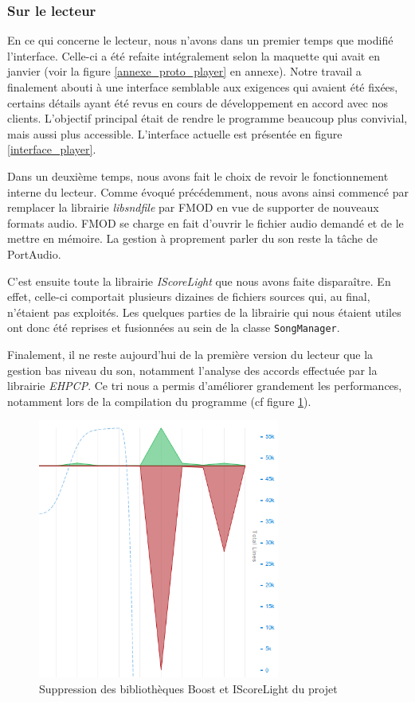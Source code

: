 \documentclass[a4paper,11pt]{article}
\begin{document}
\subsubsection{Sur le lecteur}

En ce qui concerne le lecteur, nous n'avons dans un premier temps que modifié l'interface. Celle-ci a été refaite intégralement selon la maquette qui avait en janvier (voir la figure \ref{annexe_proto_player} en annexe). Notre travail a finalement abouti à une interface semblable aux exigences qui avaient été fixées, certains détails ayant été revus en cours de développement en accord avec nos clients. L'objectif principal était de rendre le programme beaucoup plus convivial, mais aussi plus accessible. L'interface actuelle est présentée en figure \ref{interface_player}.

Dans un deuxième temps, nous avons fait le choix de revoir le fonctionnement interne du lecteur. Comme évoqué précédemment, nous avons ainsi commencé par remplacer la librairie \textit{libsndfile} par FMOD en vue de supporter de nouveaux formats audio. FMOD se charge en fait d'ouvrir le fichier audio demandé et de le mettre en mémoire. La gestion à proprement parler du son reste la tâche de PortAudio.

C'est ensuite toute la librairie \textit{IScoreLight} que nous avons faite disparaître. En effet, celle-ci comportait plusieurs dizaines de fichiers sources qui, au final, n'étaient pas exploités. Les quelques parties de la librairie qui nous étaient utiles ont donc été reprises et fusionnées au sein de la classe \texttt{SongManager}.

Finalement, il ne reste aujourd'hui de la première version du lecteur que la gestion bas niveau du son, notamment l'analyse des accords effectuée par la librairie \textit{EHPCP}. Ce tri nous a permis d'améliorer grandement les performances, notamment lors de la compilation du programme (cf figure \ref{refonte_code}).

\begin{figure}[H]
\begin{center}
\includegraphics[width=300px]{refonte_code.png}
\caption{Suppression des bibliothèques Boost et IScoreLight du projet}
\label{refonte_code}
\end{center}
\end{figure}
\end{document}

